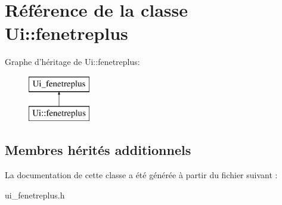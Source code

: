 \hypertarget{class_ui_1_1fenetreplus}{\section{Référence de la classe Ui\+:\+:fenetreplus}
\label{class_ui_1_1fenetreplus}
}
Graphe d'héritage de Ui\+:\+:fenetreplus\+:\begin{figure}[H]
\begin{center}
\leavevmode
\includegraphics[height=2.000000cm]{class_ui_1_1fenetreplus}
\end{center}
\end{figure}
\subsection*{Membres hérités additionnels}


La documentation de cette classe a été générée à partir du fichier suivant \+:\begin{DoxyCompactItemize}
\item 
ui\+\_\+fenetreplus.\+h\end{DoxyCompactItemize}
